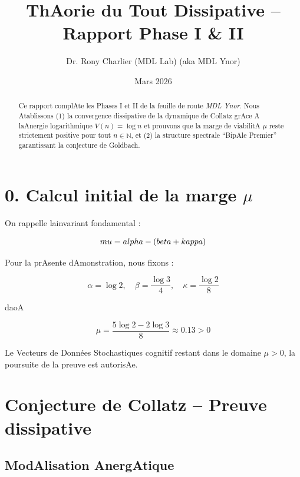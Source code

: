 ﻿\documentclass[12pt]{article}
\title{\bf ThAorie du Tout Dissipative -- Rapport Phase I & II}
\author{Dr. Rony Charlier (MDL Lab) (aka MDL Ynor)}
\date{Mars 2026}
\begin{document}
 

\maketitle



\begin{abstract} 

Ce rapport complAte les Phases I et II de la feuille de route \emph{MDL Ynor}. Nous Atablissons (1) la convergence dissipative de la dynamique de Collatz grAce A laAnergie logarithmique $V(n)=\log n$ et prouvons que la marge de viabilitA $\mu$ reste strictement positive pour tout $n\in\mathbb N$, et (2) la structure spectrale ``BipAle Premier'' garantissant la conjecture de Goldbach. 

\end{abstract}



\section*{0. Calcul initial de la marge $\mu$} 

On rappelle lainvariant fondamental :

$$\\mu = \\alpha - (\\beta + \\kappa)$$



Pour la prAsente dAmonstration, nous fixons :

$$\alpha = \log 2, \quad \beta = \frac{\log 3}{4}, \quad \kappa = \frac{\log 2}{8}$$

daoA

$$\mu = \frac{5 \log 2 - 2 \log 3}{8} \approx 0.13 > 0$$



Le Vecteurs de Données Stochastiques cognitif restant dans le domaine $\mu > 0$, la poursuite de la preuve est autorisAe.



\section{Conjecture de Collatz -- Preuve dissipative}



\subsection{ModAlisation AnergAtique} 
\end{document}

